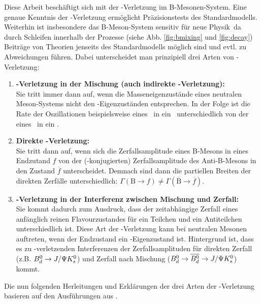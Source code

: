 Diese Arbeit beschäftigt sich mit der \CP-Verletzung im B-Mesonen-System. Eine genaue Kenntnis der \CP-Verletzung ermöglicht Präzisionstests des Standardmodells. Weiterhin ist insbesondere das B-Meson-System sensitiv für \glqq neue Physik\grqq\, da durch Schleifen innerhalb der Prozesse (siehe Abb. \ref{fig:bmixing} und \ref{fig:decay}) Beiträge von Theorien jenseits des Standardmodells möglich sind und evtl. zu Abweichungen führen. Dabei unterscheidet man prinzipiell drei Arten von \CP-Verletzung:
\begin{enumerate}
\item \textbf{\boldmath\CP-Verletzung in der Mischung (auch indirekte \CP-Verletzung):\unboldmath} \\
      Sie tritt immer dann auf, wenn die Masseneigenzustände eines neutralen Meson-Systems nicht den \CP-Eigenzuständen entsprechen. In der Folge ist die Rate der Oszillationen beispielsweise eines \Bd\ in ein \Bdbar\ unterschiedlich von der eines \Bdbar\ in ein \Bd.
\item \textbf{Direkte \boldmath\CP-Verletzung:\unboldmath} \\
      Sie tritt dann auf, wenn sich die Zerfallsamplitude eines B-Mesons in eines Endzutand $f$ von der (\CP-konjugierten) Zerfallsamplitude des Anti-B-Mesons in den Zustand $\overline{f}$ unterscheidet. Demnach sind dann die partiellen Breiten der direkten Zerfälle unterschiedlich: $\Gamma (\text{B} \rightarrow f) \neq \Gamma (\overline{\text{B}} \rightarrow \overline{f})$.
\item \textbf{\boldmath\CP-Verletzung in der Interferenz zwischen Mischung und Zerfall:\unboldmath} \\
      Sie kommt dadurch zum Ausdruck, dass der zeitabhängige Zerfall eines anfänglich reinen Flavourzustandes für ein Teilchen und ein Antiteilchen unterschiedlich ist. Diese Art der \CP-Verletzung kann bei neutralen Mesonen auftreten, wenn der Endzustand ein \CP-Eigenzustand ist. Hintergrund ist, dass es zu \CP-verletzenden Interferenzen der Zerfallsamplituden für direkten Zerfall (z.B. $\text{$B_d^0$} \rightarrow J/\Psi K_s^0$) und Zerfall nach Mischung ($\text{$B_d^0$} \rightarrow \text{$\overline{B_d^0}$} \rightarrow J/\Psi K_s^0$) kommt.
\end{enumerate}
Die nun folgenden Herleitungen und Erklärungen der drei Arten der \CP-Verletzung basieren auf den Ausführungen aus \cite{kleinknecht}.

